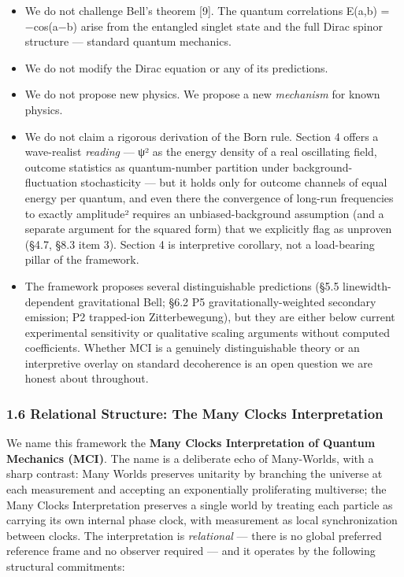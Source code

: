 \documentclass[
]{article}
\providecommand{\tightlist}{%
  \setlength{\itemsep}{0pt}\setlength{\parskip}{0pt}}
\begin{document}
\begin{itemize}
\tightlist
\item
  We do not challenge Bell's theorem {[}9{]}. The quantum correlations
  E(a,b) = −cos(a−b) arise from the entangled singlet state and the full
  Dirac spinor structure --- standard quantum mechanics.
\item
  We do not modify the Dirac equation or any of its predictions.
\item
  We do not propose new physics. We propose a new \emph{mechanism} for
  known physics.
\item
  We do not claim a rigorous derivation of the Born rule. Section 4
  offers a wave-realist \emph{reading} --- \textbar ψ\textbar² as the
  energy density of a real oscillating field, outcome statistics as
  quantum-number partition under background-fluctuation stochasticity
  --- but it holds only for outcome channels of equal energy per
  quantum, and even there the convergence of long-run frequencies to
  exactly \textbar amplitude\textbar² requires an unbiased-background
  assumption (and a separate argument for the squared form) that we
  explicitly flag as unproven (§4.7, §8.3 item 3). Section 4 is
  interpretive corollary, not a load-bearing pillar of the framework.
\item
  The framework proposes several distinguishable predictions (§5.5
  linewidth-dependent gravitational Bell; §6.2 P5
  gravitationally-weighted secondary emission; P2 trapped-ion
  Zitterbewegung), but they are either below current experimental
  sensitivity or qualitative scaling arguments without computed
  coefficients. Whether MCI is a genuinely distinguishable theory or an
  interpretive overlay on standard decoherence is an open question we
  are honest about throughout.
\end{itemize}

\subsubsection{1.6 Relational Structure: The Many Clocks
Interpretation}\label{relational-structure-the-many-clocks-interpretation}

We name this framework the \textbf{Many Clocks Interpretation of Quantum
Mechanics (MCI)}. The name is a deliberate echo of Many-Worlds, with a
sharp contrast: Many Worlds preserves unitarity by branching the
universe at each measurement and accepting an exponentially
proliferating multiverse; the Many Clocks Interpretation preserves a
single world by treating each particle as carrying its own internal
phase clock, with measurement as local synchronization between clocks.
The interpretation is \emph{relational} --- there is no global preferred
reference frame and no observer required --- and it operates by the
following structural commitments:
\end{document}
